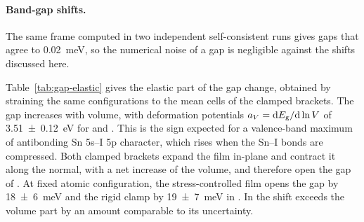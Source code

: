 {\paragraph{Band-gap shifts.}


 The same \CsSnI{} frame computed in two independent self-consistent runs
gives gaps that agree to \SI{0.02}{meV}, so the numerical noise of a gap is negligible against the
shifts discussed here.

Table~\ref{tab:gap-elastic} gives the elastic part of the gap change, obtained by straining the
same configurations to the mean cells of the clamped brackets. The gap increases with volume, with
deformation potentials $a_V = \mathrm{d}E_\mathrm{g}/\mathrm{d}\ln V$ of \SI{3.51 \pm 0.12}{eV} for \CsSnI{} and
. This is the sign expected for a valence-band maximum of
antibonding Sn 5s--I 5p character,\cite{huang2013electronic} which rises when the Sn--I bonds are
compressed. Both clamped brackets expand the film in-plane and contract it along the normal, with a net
increase of the volume, and therefore open the gap of \CsSnI{}. At fixed atomic configuration, the
stress-controlled film opens the gap by \SI{18 \pm 6}{meV} and the rigid clamp by \SI{19 \pm 7}{meV} in
\CsSnI{}. In \CsSnI{} the shift exceeds the volume part by an amount comparable to its
uncertainty.

}
